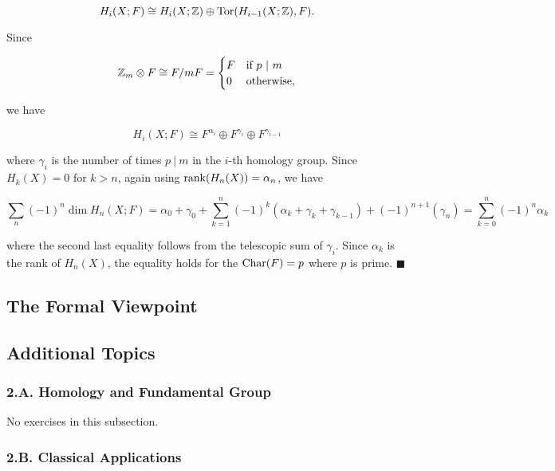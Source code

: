\documentclass{article}
\newcommand{\Z}{\mathbb{Z}}
\newcommand{\Tor}{\textnormal{Tor}}
\newcommand{\Char}{\textnormal{Char}}
\begin{document}
$$H_{i}(X; F)\cong H_{i}(X; \Z)\oplus \Tor(H_{i-1}(X; \Z), F).$$

Since

\[\Z_{m}\otimes F\cong F/mF = \begin{cases} F & \textnormal{if } p\ |\ m\\ 0 & \textnormal{otherwise}, \end{cases}\]

we have

$$H_{i}(X; F)\cong F^{\alpha_{i}}\oplus F^{\gamma_{i}}\oplus F^{\gamma_{i-1}}$$

where $\gamma_{i}$ is the number of times $p\ |\ m$ in the $i$-th homology group. Since $H_{k}(X) = 0$ for $k > n$, again using $\textnormal{rank}(H_{n}(X)) = \alpha_{n}$, we have

$$\sum_{n}(-1)^{n}\dim H_{n}(X; F) = \alpha_{0} + \gamma_{0} + \sum_{k=1}^{n} (-1)^{k}(\alpha_{k} + \gamma_{k} + \gamma_{k-1}) + (-1)^{n+1}(\gamma_{n}) = \sum_{k=0}^{n} (-1)^{n}\alpha_{k}$$

where the second last equality follows from the telescopic sum of $\gamma_{i}$. Since $\alpha_{k}$ is the rank of $H_{n}(X)$, the equality holds for the $\Char (F) = p$ where $p$ is prime. $\blacksquare$
\bigskip
\bigskip

\subsection{The Formal Viewpoint}

\subsection*{Additional Topics}

\subsubsection*{2.A. Homology and Fundamental Group}

\tab No exercises in this subsection.
\bigskip
\bigskip

\subsubsection*{2.B. Classical Applications}
\end{document}
